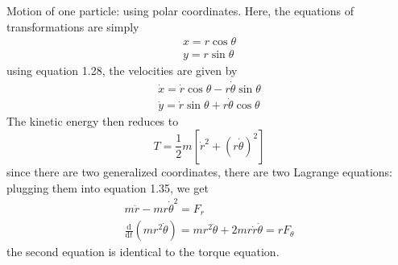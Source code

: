 \documentclass[]{article}
\numberwithin{equation}{section}
\begin{document}
Motion of one particle: using polar coordinates. Here, the equations of transformations are simply
\begin{align*}
	x=r\cos\theta\\
	y=r\sin\theta
\end{align*}
using equation 1.28, the velocities are given by
\begin{align*}
	\dot x=\dot r\cos\theta-r\dot\theta\sin\theta\\
	\dot y=\dot r\sin\theta+r\dot\theta\cos\theta
\end{align*}
The kinetic energy then reduces to 
$$T=\frac 12m\left[\dot r^2+(r\dot\theta)^2\right]$$
since there are two generalized coordinates, there are two Lagrange equations: plugging them into equation 1.35, we get
\begin{align*}
	m\ddot r-mr\dot\theta^2=F_r\\
	\frac{\mathrm d}{\mathrm dt}(mr^2\dot\theta)=mr^2\ddot\theta+2mr\dot r\dot\theta=rF_\theta
\end{align*}
the second equation is identical to the torque equation.
\end{document}
